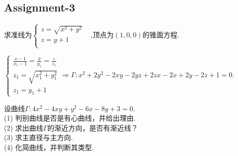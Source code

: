 \subsection{Assignment-3}

\begin{problem}
    求准线为$\begin{cases}
         z=\sqrt{x^2+y^2}&\text{}\\
         z=y+1&\text{}\\
    \end{cases} $,顶点为$(1,0,0)$的锥面方程.
\end{problem}

\begin{solution}
    $\begin{cases}
        \displaystyle \frac{x-1}{x_1-1}=\frac{y}{y_1}=\frac{z}{z_1}\\
        z_1=\sqrt{x_1^2+y_1^2}\\
        z_1=y_1+1
    \end{cases}
    \Rightarrow \Gamma:x^2+2y^2-2xy-2yz+2zx-2x+2y-2z+1=0.$
\end{solution}

\begin{problem}
    设曲线$\Gamma:4x^2-4xy+y^2-6x-8y+3=0$.\\
    (1) 判别曲线是否是有心曲线，并给出理由.\\
    (2) 求出曲线$\Gamma$的渐近方向，是否有渐近线？\\
    (3) 求主直径与主方向.\\
    (4) 化简曲线，并判断其类型.
\end{problem}

